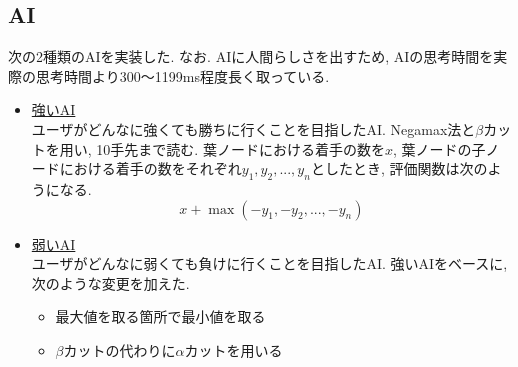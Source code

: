 \documentclass[uplatex,titlepage]{jsarticle}
\begin{document}
\subsection{AI}
次の2種類のAIを実装した. なお. AIに人間らしさを出すため, AIの思考時間を実際の思考時間より300〜1199ms程度長く取っている.
\begin{itemize}
\item \underline{強いAI}\\
ユーザがどんなに強くても勝ちに行くことを目指したAI. Negamax法と$\beta$カットを用い, 10手先まで読む. 葉ノードにおける着手の数を$x$, 葉ノードの子ノードにおける着手の数をそれぞれ$y_1, y_2, ..., y_n$としたとき, 評価関数は次のようになる.
\begin{equation}
x+\max(-y_1, -y_2, ..., -y_n)
\end{equation}
\item \underline{弱いAI}\\
ユーザがどんなに弱くても負けに行くことを目指したAI. 強いAIをベースに, 次のような変更を加えた.
\begin{itemize}
\item 最大値を取る箇所で最小値を取る
\item $\beta$カットの代わりに$\alpha$カットを用いる
\end{itemize}
\end{itemize}

\clearpage
\end{document}

